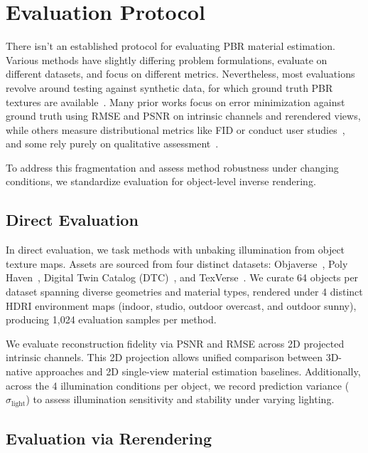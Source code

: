 \documentclass[11pt]{article}
\begin{document}
\section{Evaluation Protocol}

There isn't an established protocol for evaluating PBR material estimation. Various methods have slightly differing problem formulations, evaluate on different datasets, and focus on different metrics. Nevertheless, most evaluations revolve around testing against synthetic data, for which ground truth PBR textures are available~\cite{neurallightrig, supermat, matmart, diffusionrenderer}. Many prior works focus on error minimization against ground truth using RMSE and PSNR on intrinsic channels and rerendered views, while others measure distributional metrics like FID or conduct user studies~\cite{materialanything}, and some rely purely on qualitative assessment~\cite{trellis2}.

To address this fragmentation and assess method robustness under changing conditions, we standardize evaluation for object-level inverse rendering.

\subsection{Direct Evaluation}

In direct evaluation, we task methods with unbaking illumination from object texture maps. Assets are sourced from four distinct datasets: Objaverse~\cite{objaverse}, Poly Haven~\cite{polyhaven}, Digital Twin Catalog (DTC)~\cite{dtc}, and TexVerse~\cite{texverse}. We curate 64 objects per dataset spanning diverse geometries and material types, rendered under 4 distinct HDRI environment maps (indoor, studio, outdoor overcast, and outdoor sunny), producing 1,024 evaluation samples per method.

We evaluate reconstruction fidelity via PSNR and RMSE across 2D projected intrinsic channels. This 2D projection allows unified comparison between 3D-native approaches and 2D single-view material estimation baselines. Additionally, across the 4 illumination conditions per object, we record prediction variance ($\sigma_{\text{light}}$) to assess illumination sensitivity and stability under varying lighting.

\subsection{Evaluation via Rerendering}
\end{document}
